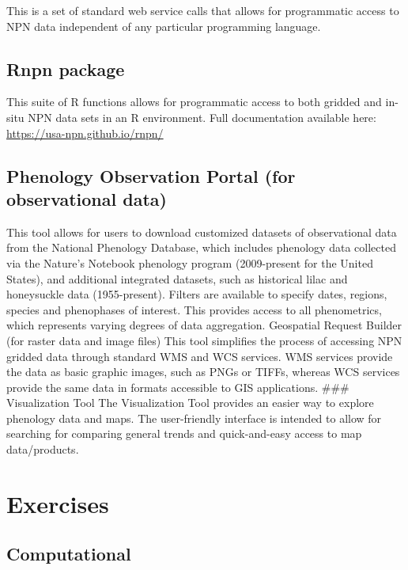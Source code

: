 \documentclass[]{book}
\begin{document}
This is a set of standard web service calls that allows for programmatic access to NPN data independent of any particular programming language.

\hypertarget{rnpn-package}{%
\subsection{Rnpn package}\label{rnpn-package}}

This suite of R functions allows for programmatic access to both gridded and in-situ NPN data sets in an R environment. Full documentation available here: \url{https://usa-npn.github.io/rnpn/}

\hypertarget{phenology-observation-portal-for-observational-data}{%
\subsection{Phenology Observation Portal (for observational data)}\label{phenology-observation-portal-for-observational-data}}

This tool allows for users to download customized datasets of observational data from the National Phenology Database, which includes phenology data collected via the Nature's Notebook phenology program (2009-present for the United States), and additional integrated datasets, such as historical lilac and honeysuckle data (1955-present). Filters are available to specify dates, regions, species and phenophases of interest. This provides access to all phenometrics, which represents varying degrees of data aggregation.
Geospatial Request Builder (for raster data and image files)
This tool simplifies the process of accessing NPN gridded data through standard WMS and WCS services. WMS services provide the data as basic graphic images, such as PNGs or TIFFs, whereas WCS services provide the same data in formats accessible to GIS applications.
\#\#\# Visualization Tool
The Visualization Tool provides an easier way to explore phenology data and maps. The user-friendly interface is intended to allow for searching for comparing general trends and quick-and-easy access to map data/products.

\hypertarget{exercises}{%
\section{Exercises}\label{exercises}}

\hypertarget{computational}{%
\subsection{Computational}\label{computational}}
\end{document}
